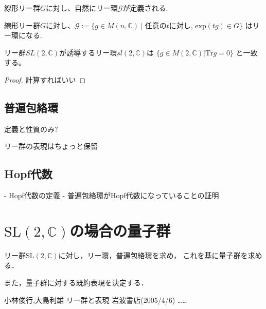\documentclass{ujarticle}
\begin{document}
線形リー群$G$に対し、自然にリー環$\mathcal{G}$が定義される.
\begin{prop}
 線形リー群$G$に対し、$\mathcal{G}:=\{g \in M(n,\mathbb{C})\mid $任意の$t$に対し,
 $\mathrm{exp}(tg) \in G\}$ はリー環になる.
\end{prop}

\begin{epl}
リー群$SL(2,\mathbb{C})$が誘導するリー環$sl(2,\mathbb{C})$は
$\{ g \in M(2,\mathbb{C}) | \mathrm{Tr}g = 0 \}$
と一致する。
\end{epl}
\begin{proof}
 計算すればいい
\end{proof}

\subsection{普遍包絡環}
\label{sub:普遍包絡環}

定義と性質のみ?


リー群の表現はちょっと保留


\subsection{Hopf代数}
\label{sub:Hopf代数}

- Hopf代数の定義
- 普遍包絡環がHopf代数になっていることの証明

\section{$\mathrm{SL}(2,\mathbb{C})$の場合の量子群}
\label{sec:SL(2,\mathbb{C})}
リー群$\mathrm{SL}(2,\mathbb{C})$に対し，リー環，普遍包絡環を求め，
これを基に量子群を求める．

また，量子群に対する既約表現を決定する．


\begin{thebibliography}{99}
   小林俊行,大島利雄 リー群と表現 岩波書店(2005/4/6)
    ……
\end{thebibliography}
\end{document}
